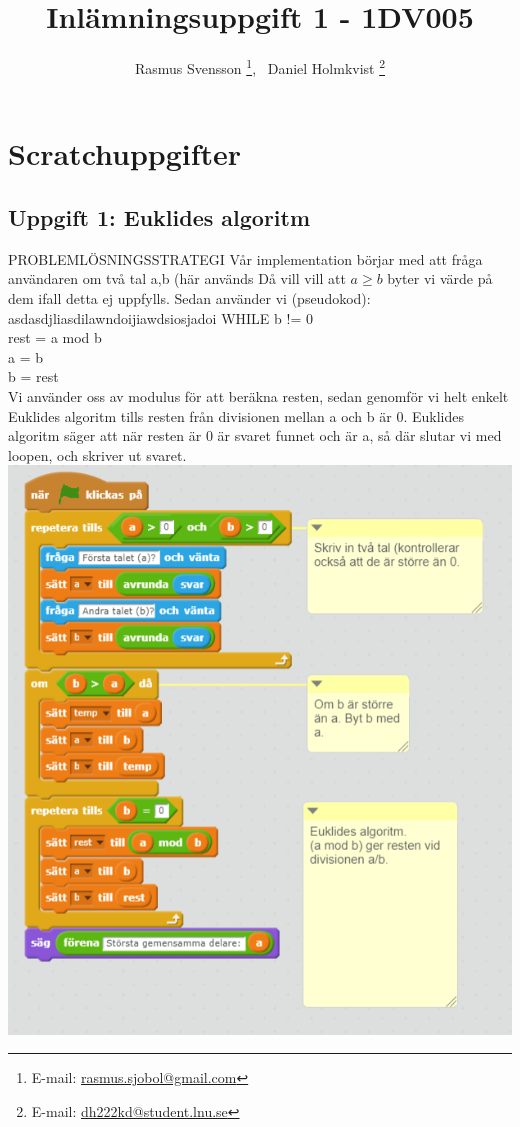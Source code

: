 \documentclass[12pt,a4paper]{article}
\begin{document}
\author{Rasmus Svensson%
  \thanks{E-mail: \href{mailto:rasmus.sjobol@gmail.com}{rasmus.sjobol@gmail.com}}, \ {Daniel Holmkvist%
  \thanks{E-mail: \href{mailto:dh222kd@student.lnu.se}{dh222kd@student.lnu.se}}}}
\title{Inlämningsuppgift 1 - 1DV005}
\maketitle
\tableofcontents
\newpage
\section{Scratchuppgifter}
\subsection{Uppgift 1: Euklides algoritm}
PROBLEMLÖSNINGSSTRATEGI 
Vår implementation börjar med att fråga användaren om två tal a,b (här används  Då vill vill att $ a \geq b$ byter vi värde på dem ifall detta ej uppfylls. Sedan använder vi (pseudokod): 
\\asdasdjliasdilawndoijiawdsiosjadoi
WHILE b != 0         \\
 	rest = a mod b \\
	a = b \\
	b = rest \\ 
	
Vi använder oss av modulus för att beräkna resten, sedan genomför vi helt enkelt Euklides algoritm tills resten från divisionen mellan a och b är 0. Euklides algoritm säger att när resten är 0 är svaret funnet och är a, så där slutar vi med loopen, och skriver ut svaret. \\

\includegraphics[scale=0.85]{euklidesimpl}
\end{document}
